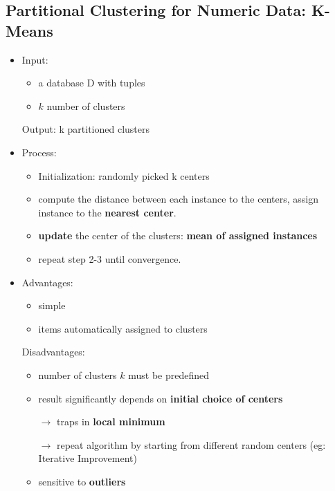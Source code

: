 \subsection{Partitional Clustering for Numeric Data: K-Means}
\begin{itemize}
	\item Input: 
	\begin{itemize}
		\item a database D with tuples
		\item $k$ number of clusters
	\end{itemize}
	 
	Output: k partitioned clusters
	\item Process:
	\begin{itemize}
		\item Initialization: randomly picked k centers
		\item compute the distance between each instance to the centers, assign instance to the \textbf{nearest center}.
		\item \textbf{update} the center of the clusters: \textbf{mean of assigned instances}
		\item repeat step 2-3 until convergence.
	\end{itemize}

	\item Advantages:
	\begin{itemize}
		\item simple
		\item items automatically assigned to clusters
	\end{itemize}
	Disadvantages:
	\begin{itemize}
		\item number of clusters $k$ must be predefined
		\item result significantly depends on \textbf{initial choice of centers} 
		
		$\rightarrow$ traps in \textbf{local minimum} 
		
		$\rightarrow$ repeat algorithm by starting from different random centers (eg: Iterative Improvement)
		\item sensitive to \textbf{outliers}
	\end{itemize}
\end{itemize}

